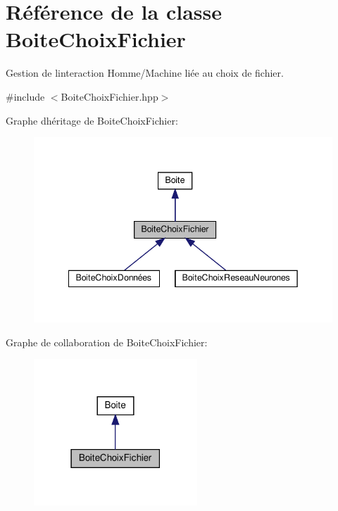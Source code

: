 \hypertarget{classBoiteChoixFichier}{}\section{Référence de la classe Boite\+Choix\+Fichier}
\label{classBoiteChoixFichier}


Gestion de l\textquotesingle{}interaction Homme/\+Machine liée au choix de fichier.  




{\ttfamily \#include $<$Boite\+Choix\+Fichier.\+hpp$>$}



Graphe d\textquotesingle{}héritage de Boite\+Choix\+Fichier\+:
\nopagebreak
\begin{figure}[H]
\begin{center}
\leavevmode
\includegraphics[width=342pt]{classBoiteChoixFichier__inherit__graph}
\end{center}
\end{figure}


Graphe de collaboration de Boite\+Choix\+Fichier\+:
\nopagebreak
\begin{figure}[H]
\begin{center}
\leavevmode
\includegraphics[width=174pt]{classBoiteChoixFichier__coll__graph}
\end{center}
\end{figure}

